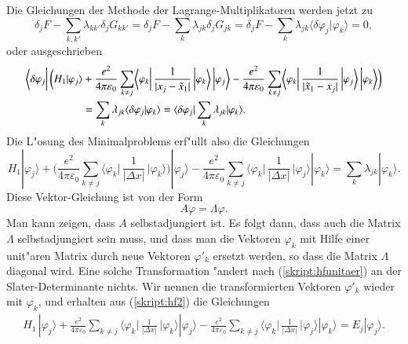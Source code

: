 Die Gleichungen der Methode der Lagrange-Multiplikatoren werden 
jetzt zu
\[
\delta_j F - \sum_{k,k'}\lambda_{kk'}\delta_j G_{kk'}
=
\delta_j F
-
\sum_{k}\lambda_{jk}\delta_j G_{jk}
=\delta_jF
-\sum_k\lambda_{jk}\langle\delta\varphi_j|\varphi_k\rangle
=0,
\]
oder ausgeschrieben
\begin{align}
\bigg\langle\delta\varphi_j\bigg|\,
\bigg(
H_1|\varphi_j\rangle
&+
\frac{e^2}{4\pi\varepsilon_0}
\sum_{k\ne j}
\biggl\langle\varphi_k\biggr|\,
\frac{1}{|x_j-\tilde x_1|}
\,\biggl|\varphi_k\biggr\rangle
\,\biggl|\varphi_j\biggr\rangle
\notag
-
\frac{e^2}{4\pi\varepsilon_0}
\sum_{k\ne j}
\biggl\langle\varphi_k\biggr|\,
\frac{1}{|\tilde x_1-x_j|}
\,\biggl|\varphi_j\biggr\rangle
\,\biggl|\varphi_k\biggr\rangle
\biggr)
\\
\qquad\qquad
&=
\sum_k\lambda_{jk}\langle\delta\varphi_j|\varphi_k\rangle
=
\langle\delta\varphi_j|
\sum_k\lambda_{jk}
|\varphi_k\rangle.
\label{skript:hf1}
\end{align}
Die L"osung des Minimalproblems erf"ullt also die Gleichungen
\begin{equation}
H_1|\varphi_j\rangle
+
\biggl(
\frac{e^2}{4\pi\varepsilon_0}
\sum_{k\ne j}
\biggl\langle\varphi_k\biggl|\,
\frac{1}{|\Delta x|}
\,\biggr|\varphi_k\biggr\rangle
\biggr)
|\varphi_j\rangle
-
\frac{e^2}{4\pi\varepsilon_0}
\sum_{k\ne j}
\biggl\langle\varphi_k\biggl|\,
\frac{1}{|\Delta x|}
\,\biggr|\varphi_j\biggr\rangle
|\varphi_k\rangle
=
\sum_k\lambda_{jk}
|\varphi_k\rangle.
\label{skript:hf2}
\end{equation}
Diese Vektor-Gleichung ist von der Form
\[
A\varphi = \Lambda \varphi.
\]
Man kann zeigen, dass $A$ selbstadjungiert ist.
Es folgt dann, dass auch die Matrix $\Lambda$ selbstadjungiert sein muss,
und dass man die Vektoren $\varphi_k$ mit Hilfe einer unit"aren Matrix durch
neue Vektoren $\varphi'_k$ ersetzt werden, so dass die
Matrix $\Lambda$ diagonal wird.
Eine solche Transformation "andert nach (\ref{skript:hfunitaer})
an der Slater-Determinante nichts.
Wir nennen die transformierten Vektoren $\varphi'_k$ wieder mit $\varphi_k$,
und erhalten aus (\ref{skript:hf2}) die Gleichungen
\begin{align}
H_1\,|\varphi_j\rangle
+
\frac{e^2}{4\pi\varepsilon_0}
\sum_{k\ne j}
\biggl\langle\varphi_k\biggl|\,
\frac{1}{|\Delta x|}
\,\biggr|\varphi_k\biggr\rangle
|\varphi_j\rangle
-
\frac{e^2}{4\pi\varepsilon_0}
\sum_{k\ne j}
\biggl\langle\varphi_k\biggl|\,
\frac{1}{|\Delta x|}
\,\biggr|\varphi_j\biggr\rangle
|\varphi_k\rangle
=
E_j
| \varphi_j\rangle.
\label{skript:hf3}
\end{align}

